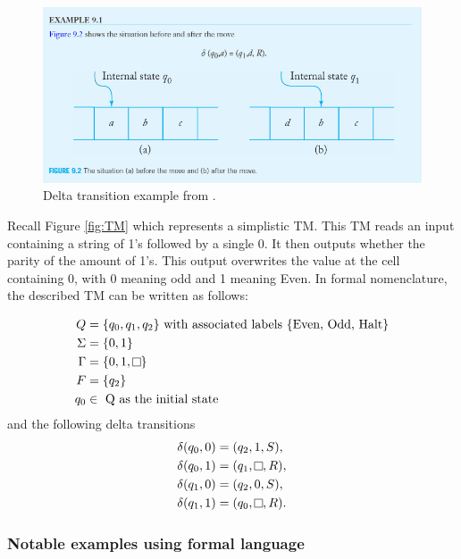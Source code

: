 \begin{figure}[h]
    \centering
    \includegraphics[width=16cm]{Images/deltatransition.png}
       \caption{Delta transition example from \cite{IntroFormLangAuto}.}
           \label{fig:DeltaTransition}
\end{figure}

Recall Figure \ref{fig:TM} which represents a simplistic TM.
This TM reads an input containing a string of 1's followed by a single 0.
It then outputs whether the parity of the amount of 1's.
This output overwrites the value at the cell containing 0, with 0 meaning odd and 1 meaning Even.
In formal nomenclature, the described TM can be written as follows:

\[
    \begin{aligned}
        Q &= \{q_{0}, q_{1}, q_{2}\} \text{ with associated labels \{Even, Odd, Halt\}}\\
        \Sigma &= \{0,1\}\\
        \Gamma &= \{0,1,\raisebox{0.1cm}{\fbox{}}\}\\
        F &= \{q_{2}\}\\
        q_{0} &\in \text{ Q as the initial state}
    \end{aligned}
\]
\hspace{3.3cm}and the following delta transitions
\[
    \begin{aligned}
        \delta (q_{0}, 0) &= (q_{2}, 1, S),\\
        \delta (q_{0}, 1) &= (q_{1}, \raisebox{0.1cm}{\fbox{}}, R),\\
        \delta (q_{1}, 0) &= (q_{2}, 0, S),\\
        \delta (q_{1}, 1) &= (q_{0}, \raisebox{0.1cm}{\fbox{}}, R).\\
    \end{aligned}
\]

\subsubsection{Notable examples using formal language}\label{subsubsec:NotableEgsFormalLang}

